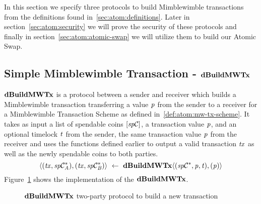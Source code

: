 In this section we specify three protocols to build Mimblewimble transactions from the definitions found in~\cref{sec:atom:definitions}.
Later in section~\cref{sec:atom:security} we will prove the security of these protocols and finally in section~\cref{sec:atom:atomic-swap} we will utilize them to build our Atomic Swap.

\subsection{Simple Mimblewimble Transaction - $\mathbf{dBuildMWTx}$} \label{subsec:atom:simple-mw-tx}

$\mathbf{dBuildMWTx}$ is a protocol between a sender and receiver which builds a Mimblewimble transaction transferring a value $\mathit{p}$ from the sender to a receiver for a Mimblewimble Transaction Scheme as defined in~\cref{def:atom:mw-tx-scheme}.
It takes as input a list of spendable coins $[\mathit{sp}\mathcal{C}]$, a transaction value $\mathit{p}$, and an optional timelock $\mathit{t}$ from the sender, the same transaction value $\mathit{p}$ from the receiver and uses the functions defined earlier to output a valid transaction $\mathit{tx}$ as well as the newly spendable coins to both parties.
\[ \langle (\mathit{tx}, \mathit{sp}\mathcal{C}_{\mathit{A}}^*), (\mathit{tx}, \mathit{sp}\mathcal{C}_{\mathit{B}}^*) \rangle ~\leftarrow~ \mathbf{dBuildMWTx} \langle(\mathit{sp}\mathcal{C}^*,\mathit{p},\mathit{t}), (\mathit{p})\rangle \]
Figure~\cref{fig:d-build-mw-tx} shows the implementation of the $\mathbf{dBuildMWTx}$.

\begin{figure}
    \begin{center}
    \end{center}
    \caption{$\mathbf{dBuildMWTx}$ two-party protocol to build a new transaction} \label{fig:d-build-mw-tx}
\end{figure}

